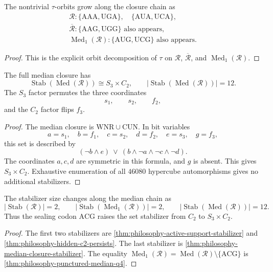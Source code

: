 \begin{corollary}
\label{cor:philosophy-tau-orbit-growth}
The nontrivial $\tau$-orbits grow along the closure chain as
$$
\begin{gathered}
  \mathcal{R}:
  \{\mathrm{AAA},\mathrm{UGA}\},\quad
  \{\mathrm{AUA},\mathrm{UCA}\},\\
  \overline{\mathcal{R}}:
  \{\mathrm{AAG},\mathrm{UGG}\}\text{ also appears},\\
  \operatorname{Med}_{1}(\mathcal{R}):
  \{\mathrm{AUG},\mathrm{UCG}\}\text{ also appears}.
\end{gathered}
$$
\end{corollary}
\begin{proof}
This is the explicit orbit decomposition of $\tau$ on
$\mathcal{R}$, $\overline{\mathcal{R}}$, and
$\operatorname{Med}_{1}(\mathcal{R})$.
\end{proof}

\begin{theorem}
\label{thm:philosophy-median-closure-stabilizer}
The full median closure has
$$
  \operatorname{Stab}(\operatorname{Med}(\mathcal{R}))
  \cong
  S_{3}\times C_{2},
  \qquad
  |\operatorname{Stab}(\operatorname{Med}(\mathcal{R}))|=12.
$$
The $S_{3}$ factor permutes the three coordinates
$$
  s_{1},\qquad s_{2},\qquad f_{2},
$$
and the $C_{2}$ factor flips $f_{3}$.
\end{theorem}
\begin{proof}
The median closure is $\mathrm{WNR}\cup\mathrm{CUN}$. In bit variables
$$
  a=s_{1},\quad b=f_{1},\quad c=s_{2},\quad d=f_{2},
  \quad e=s_{3},\quad g=f_{3},
$$
this set is described by
$$
  (\neg b\land e)
  \ \lor\
  (b\land\neg a\land\neg c\land\neg d).
$$
The coordinates $a,c,d$ are symmetric in this formula, and $g$ is
absent. This gives $S_{3}\times C_{2}$. Exhaustive enumeration of all
$46080$ hypercube automorphisms gives no additional stabilizers.
\end{proof}

\begin{corollary}
\label{cor:philosophy-symmetry-restoration-sealing-corner}
The stabilizer size changes along the median chain as
$$
  |\operatorname{Stab}(\mathcal{R})|=2,
  \qquad
  |\operatorname{Stab}(\operatorname{Med}_{1}(\mathcal{R}))|=2,
  \qquad
  |\operatorname{Stab}(\operatorname{Med}(\mathcal{R}))|=12.
$$
Thus the sealing codon $\mathrm{ACG}$ raises the set stabilizer from
$C_{2}$ to $S_{3}\times C_{2}$.
\end{corollary}
\begin{proof}
The first two stabilizers are
\autoref{thm:philosophy-active-support-stabilizer} and
\autoref{thm:philosophy-hidden-c2-persists}. The last stabilizer is
\autoref{thm:philosophy-median-closure-stabilizer}. The equality
$\operatorname{Med}_{1}(\mathcal{R})
=\operatorname{Med}(\mathcal{R})\setminus\{\mathrm{ACG}\}$ is
\autoref{thm:philosophy-punctured-median-q4}.
\end{proof}

